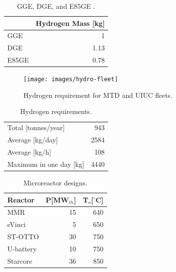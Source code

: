 \documentclass[11pt,letterpaper]{article}
\begin{document}
    \column[t]{5cm}
	\begin{table}[!htb]
		\centering
	    \caption{GGE, DGE, and E85GE \cite{doe_office_of_energy_efficiency_and_renewable_energy_hydrogen_2020} \cite{alternative_fuels_data_center_fuel_2014}.}
		\begin{tabular}{lr}
		\hline
		                 & Hydrogen Mass [kg] \\ \hline
		GGE              & 1                  \\
		DGE              & 1.13               \\
		E85GE            & 0.78               \\ \hline
        \end{tabular}
	\end{table}

	\begin{figure}[htbp!]
	    \centering
		\texttt{[image: images/hydro-fleet]}
		\hfill
		\caption{Hydrogen requirement for MTD and UIUC fleets.}
		\label{fig:hydro-fleet}
	\end{figure}

	\begin{table}[!htb]
		\centering
	    \caption{Hydrogen requirements.}
		\begin{tabular}{lr}
		\hline
		Total [tonnes/year]     & 943    \\
		Average [kg/day] 	    & 2584   \\
		Average [kg/h] 		    & 108    \\
		Maximum in one day [kg] & 4440   \\ \hline
        \end{tabular}
        \label{tab:hydro-fleet}
	\end{table}

	\begin{table}[!htb]
		\centering
	    \caption{Microreactor designs.}
		\begin{tabular}{lrr}
		\hline
		Reactor                                      & P[MW$_{th}$] & T$_o$[$^\circ$C] \\ \hline
		MMR \cite{usnc_mmr_2019}  		             & 15           & 640              \\
		eVinci \cite{hernandez_micro_2019}           & 5            & 650              \\
		ST-OTTO \cite{harlan_x-energy_2018}          & 30           & 750              \\
		U-battery \cite{ding_design_2011}            & 10           & 750              \\
		Starcore \cite{star_core_nuclear_star_2015}  & 36           & 850              \\ \hline
        \end{tabular}
        \label{tab:hydro-micro}
	\end{table}
\end{document}
